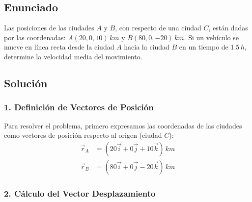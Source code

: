 \documentclass[12pt, a4paper]{article}
\begin{document}
\newpage

\subsection*{Enunciado}

Las posiciones de las ciudades $A$ y $B$, con respecto de una ciudad $C$, están dadas por las coordenadas: $A(20, 0, 10) \, \si{km}$ y $B(80, 0, -20) \, \si{km}$. Si un vehículo se mueve en línea recta desde la ciudad $A$ hacia la ciudad $B$ en un tiempo de $1.5 \, \si{h}$, determine la velocidad media del movimiento.

\begin{center}
\end{center}

\subsection*{Solución}

\subsubsection*{1. Definición de Vectores de Posición}

Para resolver el problema, primero expresamos las coordenadas de las ciudades como vectores de posición respecto al origen (ciudad $C$):
\begin{align*}
    \vec{r}_A &= (20\vec{i} + 0\vec{j} + 10\vec{k}) \, \si{km} \\
    \vec{r}_B &= (80\vec{i} + 0\vec{j} - 20\vec{k}) \, \si{km}
\end{align*}

\subsubsection*{2. Cálculo del Vector Desplazamiento}
\end{document}
